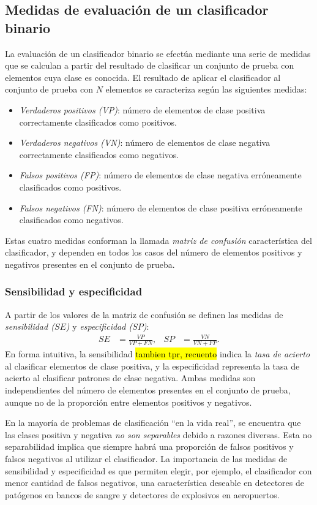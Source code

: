 \documentclass[12pt,bibliography=oldstyle,DIV=12,parskip=half-]{scrreprt}
\newcommand{\e}{\emph}
\begin{document}
\subsection{Medidas de evaluación de un clasificador binario}
%
La evaluación de un clasificador binario se efectúa mediante una serie
de medidas que se calculan a partir del resultado de clasificar un
conjunto de prueba con elementos cuya clase es conocida.  El resultado
de aplicar el clasificador al conjunto de prueba con $N$ elementos se
caracteriza según las siguientes medidas:
%
\begin{itemize}[style=nextline]
  \item\emph{Verdaderos positivos (VP)}: número de elementos de clase
    positiva correctamente clasificados como positivos.
  \item\emph{Verdaderos negativos (VN)}: número de elementos de clase
    negativa correctamente clasificados como negativos.
  \item\emph{Falsos positivos (FP)}: número de elementos de clase
    negativa erróneamente clasificados como positivos.
  \item\emph{Falsos negativos (FN)}: número de elementos de clase
    positiva erróneamente clasificados como negativos.
\end{itemize}
%
Estas cuatro medidas conforman la llamada \emph{matriz de confusión}
característica del clasificador, y dependen en todos los casos del
número de elementos positivos y negativos presentes en el conjunto de
prueba.
%
\subsubsection{Sensibilidad y especificidad}
%
A partir de los valores de la matriz de confusión se definen las
medidas de \emph{sensibilidad ($SE$)} y \emph{especificidad ($SP$)}:
%
\begin{align*}
SE & = \frac{VP}{VP+FN}, & SP & = \frac{VN}{VN+FP}.
\end{align*}
%
En forma intuitiva, la sensibilidad \hl{tambien tpr, recuento}
indica la \emph{tasa de acierto}
al clasificar elementos de clase positiva, y la especificidad
representa la tasa de acierto al clasificar patrones de clase
negativa.  Ambas medidas son independientes del número de elementos
presentes en el conjunto de prueba, aunque no de la proporción entre
elementos positivos y negativos.

En la mayoría de problemas de clasificación ``en la vida real'',
se encuentra que las clases positiva y negativa \e{no son separables}
debido a razones diversas. Esta no separabilidad implica que siempre
habrá una proporción de falsos positivos y falsos negativos al
utilizar el clasificador.
La importancia de las medidas de sensibilidad y especificidad es que
permiten elegir, por ejemplo, el clasificador con menor cantidad de
falsos negativos, una característica deseable en detectores de
patógenos en bancos de sangre y detectores de explosivos en
aeropuertos.
%
\end{document}
